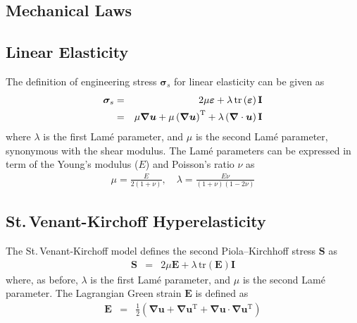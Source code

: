 \documentclass[sn-mathphys,Numbered]{sn-jnl}%
\newcommand{\bb}{\boldsymbol}
\begin{document}
\begin{appendices}

\section{Mechanical Laws}
\label{app:mechLaws}

\subsection{Linear Elasticity}
The definition of engineering stress $\bb{\sigma}_s$ for linear elasticity can be given as
\begin{eqnarray}  \label{eq:linearElastic}
	\bb{\sigma}_s
	&=& 2 \mu \bb{\varepsilon} + \lambda \, \text{tr} \left( \bb{\varepsilon} \right) \textbf{I} \notag \\
	&=& \mu \bb{\nabla} \bb{u} + \mu \left( \bb{\nabla} \bb{u}\right)^{\text{T}} + \lambda \left(\bb{\nabla} \cdot \bb{u} \right) \textbf{I}
\end{eqnarray}
where $\lambda$ is the first Lam\'{e} parameter, and $\mu$ is the second Lam\'{e} parameter, synonymous with the shear modulus.
The Lam\'{e} parameters can be expressed in term of the Young's modulus ($E$) and Poisson's ratio $\nu$ as
\begin{eqnarray}
	\mu = \frac{E}{2(1 + \nu)}, \quad \lambda = \frac{E \nu}{(1+\nu)(1 - 2\nu)}
\end{eqnarray}

\subsection{St.\,Venant-Kirchoff Hyperelasticity}
The St.\,Venant-Kirchoff model defines the second Piola–Kirchhoff stress $\textbf{S}$ as
\begin{eqnarray}
	\bb{S} &=& 2 \mu \bb{E} + \lambda \, \text{tr} \left( \bb{E} \right) \textbf{I}
\end{eqnarray}
where, as before, $\lambda$ is the first Lam\'{e} parameter, and $\mu$ is the second Lam\'{e} parameter.
The Lagrangian Green strain $\textbf{E}$ is defined as
\begin{eqnarray}
	\bb{E} &=& \frac{1}{2} \left( \bb{\nabla} \bb{u} + \bb{\nabla} \bb{u}^{\text{T}} + \bb{\nabla} \bb{u} \cdot \bb{\nabla} \bb{u}^{\text{T}}  \right)
\end{eqnarray}


\end{appendices}
\end{document}
